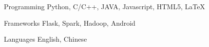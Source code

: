 

\begin{cvskills}

  \cvskill
    {Programming} %
    {Python, C/C++, JAVA, Javascript, HTML5, LaTeX} %

  \cvskill
    {Frameworks} %
    {Flask, Spark, Hadoop, Android} %

  \cvskill
    {Languages} %
    {English, Chinese} %

\end{cvskills}
